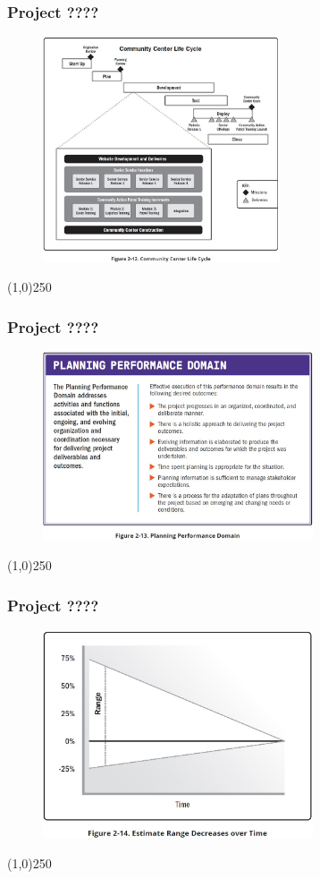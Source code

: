 \begin{frame}
\frametitle{Project ????}
 \begin{figure}
    \centering
        \includegraphics[width = 7cm]{../images/guide/Fig2-12.jpg}
    \label{guidefig:2-12}
 \end{figure}
\end{frame}
\begin{center}\line(1,0){250}\end{center}

\begin{frame}
\frametitle{Project ????}
 \begin{figure}
    \centering
        \includegraphics[width = 8cm]{../images/guide/Fig2-13.jpg}
    \label{guidefig:2-13}
 \end{figure}
\end{frame}
\begin{center}\line(1,0){250}\end{center}

\begin{frame}
\frametitle{Project ????}
 \begin{figure}
    \centering
        \includegraphics[width = 8cm]{../images/guide/Fig2-14.jpg}
    \label{guidefig:2-14}
 \end{figure}
\end{frame}
\begin{center}\line(1,0){250}\end{center}

